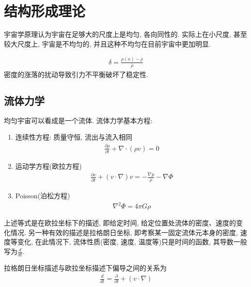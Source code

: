 \newpage
\section{结构形成理论}
宇宙学原理认为宇宙在足够大的尺度上是均匀, 各向同性的. 实际上在小尺度, 甚至较大尺度上, 宇宙是不均匀的, 并且这种不均匀在目前宇宙中更加明显. 

\begin{align*}
    \delta=\frac{\rho(x)-\bar{\rho}}{\bar{\rho}}
\end{align*}
密度的涨落的扰动导致引力不平衡破坏了稳定性. 

\subsection{流体力学}
均匀宇宙可以看成是一个流体. 流体力学基本方程:
\begin{enumerate}
    \item 连续性方程: 质量守恒, 流出与流入相同
    \begin{align}
        \frac{\partial \rho}{\partial t}+\nabla \cdot (\rho v)=0 \label{EE1}
    \end{align} 
    \item 运动学方程(欧拉方程)
    \begin{align}
        \frac{\partial v}{\partial t}+(v\cdot \nabla)v=-\frac{\nabla p}{\rho}-\nabla \Phi \label{EE2}
    \end{align}
    \item Poisson(泊松方程)
    \begin{align}
        \nabla^2 \Phi=4\pi G\rho \label{EE3}
    \end{align}
\end{enumerate}
上述等式是在欧拉坐标下的描述, 即给定时间, 给定位置处流体的密度、速度的变化情况. 另一种有效的描述是拉格朗日坐标, 即考察某一固定流体元本身的密度, 速度等变化, 在此情况下, 流体性质(密度, 速度, 温度等)只是时间的函数, 其导数一般写为$\frac{d}{dt}$. 

拉格朗日坐标描述与欧拉坐标描述下偏导之间的关系为
\begin{align*}
    \frac{d}{dt}=\frac{\partial }{\partial t}+(v\cdot\nabla)
\end{align*}

